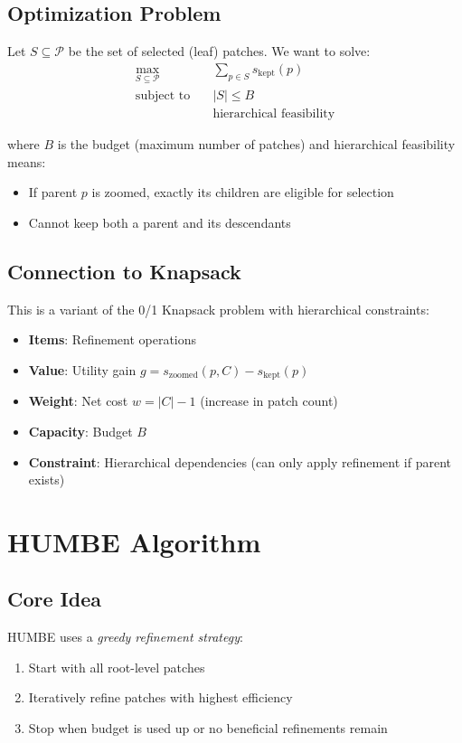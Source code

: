 \documentclass[11pt]{article}
\begin{document}
\subsection{Optimization Problem}
Let $S \subseteq \mathcal{P}$ be the set of selected (leaf) patches. We want to solve:
\begin{align}
\max_{S \subseteq \mathcal{P}} \quad & \sum_{p \in S} s_{\text{kept}}(p) \\
\text{subject to} \quad & |S| \leq B \\
& \text{hierarchical feasibility}
\end{align}

where $B$ is the budget (maximum number of patches) and hierarchical feasibility means:
\begin{itemize}[nosep]
    \item If parent $p$ is zoomed, exactly its children are eligible for selection
    \item Cannot keep both a parent and its descendants
\end{itemize}

\subsection{Connection to Knapsack}
This is a variant of the 0/1 Knapsack problem with hierarchical constraints:
\begin{itemize}[nosep]
    \item \textbf{Items}: Refinement operations
    \item \textbf{Value}: Utility gain $g = s_{\text{zoomed}}(p, C) - s_{\text{kept}}(p)$
    \item \textbf{Weight}: Net cost $w = |C| - 1$ (increase in patch count)
    \item \textbf{Capacity}: Budget $B$
    \item \textbf{Constraint}: Hierarchical dependencies (can only apply refinement if parent exists)
\end{itemize}

\section{HUMBE Algorithm}

\subsection{Core Idea}
HUMBE uses a \emph{greedy refinement strategy}:
\begin{enumerate}[nosep]
    \item Start with all root-level patches
    \item Iteratively refine patches with highest efficiency
    \item Stop when budget is used up or no beneficial refinements remain
\end{enumerate}
\end{document}
